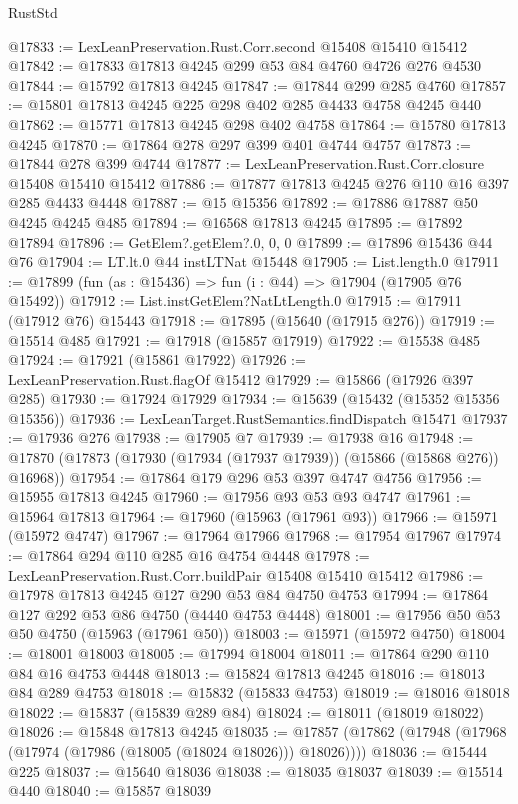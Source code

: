\begin{lexlean}{RustStd}
\begin{coremodule}
{\begin{coremodule}
{{{{{{{{{{{{{{{{{{{{{{{{{{{{{{{{{{{{{{{{{{{{{{{{{{{{{{{{{{{{@17833 := LexLeanPreservation.Rust.Corr.second @15408 @15410 @15412
@17842 := @17833 @17813 @4245 @299 @53 @84 @4760 @4726 @276 @4530
@17844 := @15792 @17813 @4245
@17847 := @17844 @299 @285 @4760
@17857 := @15801 @17813 @4245 @225 @298 @402 @285 @4433 @4758 @4245 @440
@17862 := @15771 @17813 @4245 @298 @402 @4758
@17864 := @15780 @17813 @4245
@17870 := @17864 @278 @297 @399 @401 @4744 @4757
@17873 := @17844 @278 @399 @4744
@17877 := LexLeanPreservation.Rust.Corr.closure @15408 @15410 @15412
@17886 := @17877 @17813 @4245 @276 @110 @16 @397 @285 @4433 @4448
@17887 := @15 @15356
@17892 := @17886 @17887 @50 @4245 @4245 @485
@17894 := @16568 @17813 @4245
@17895 := @17892 @17894
@17896 := GetElem?.getElem?.{0, 0, 0}
@17899 := @17896 @15436 @44 @76
@17904 := LT.lt.{0} @44 instLTNat @15448
@17905 := List.length.{0}
@17911 := @17899 (fun (as : @15436) => fun (i : @44) => @17904 (@17905 @76 @15492))
@17912 := List.instGetElem?NatLtLength.{0}
@17915 := @17911 (@17912 @76) @15443
@17918 := @17895 (@15640 (@17915 @276))
@17919 := @15514 @485
@17921 := @17918 (@15857 @17919)
@17922 := @15538 @485
@17924 := @17921 (@15861 @17922)
@17926 := LexLeanPreservation.Rust.flagOf @15412
@17929 := @15866 (@17926 @397 @285)
@17930 := @17924 @17929
@17934 := @15639 (@15432 (@15352 @15356 @15356))
@17936 := LexLeanTarget.RustSemantics.findDispatch @15471
@17937 := @17936 @276
@17938 := @17905 @7
@17939 := @17938 @16
@17948 := @17870 (@17873 (@17930 (@17934 (@17937 @17939)) (@15866 (@15868 @276)) @16968))
@17954 := @17864 @179 @296 @53 @397 @4747 @4756
@17956 := @15955 @17813 @4245
@17960 := @17956 @93 @53 @93 @4747
@17961 := @15964 @17813
@17964 := @17960 (@15963 (@17961 @93))
@17966 := @15971 (@15972 @4747)
@17967 := @17964 @17966
@17968 := @17954 @17967
@17974 := @17864 @294 @110 @285 @16 @4754 @4448
@17978 := LexLeanPreservation.Rust.Corr.buildPair @15408 @15410 @15412
@17986 := @17978 @17813 @4245 @127 @290 @53 @84 @4750 @4753
@17994 := @17864 @127 @292 @53 @86 @4750 (@4440 @4753 @4448)
@18001 := @17956 @50 @53 @50 @4750 (@15963 (@17961 @50))
@18003 := @15971 (@15972 @4750)
@18004 := @18001 @18003
@18005 := @17994 @18004
@18011 := @17864 @290 @110 @84 @16 @4753 @4448
@18013 := @15824 @17813 @4245
@18016 := @18013 @84 @289 @4753
@18018 := @15832 (@15833 @4753)
@18019 := @18016 @18018
@18022 := @15837 (@15839 @289 @84)
@18024 := @18011 (@18019 @18022)
@18026 := @15848 @17813 @4245
@18035 := @17857 (@17862 (@17948 (@17968 (@17974 (@17986 (@18005 (@18024 @18026))) @18026))))
@18036 := @15444 @225
@18037 := @15640 @18036
@18038 := @18035 @18037
@18039 := @15514 @440
@18040 := @15857 @18039
}}}}}}}}}}}}}}}}}}}}}}}}}}}}}}}}}}}}}}}}}}}}}}}}}}}}}}}}}}}}
\end{coremodule}}
\end{coremodule}
\end{lexlean}
